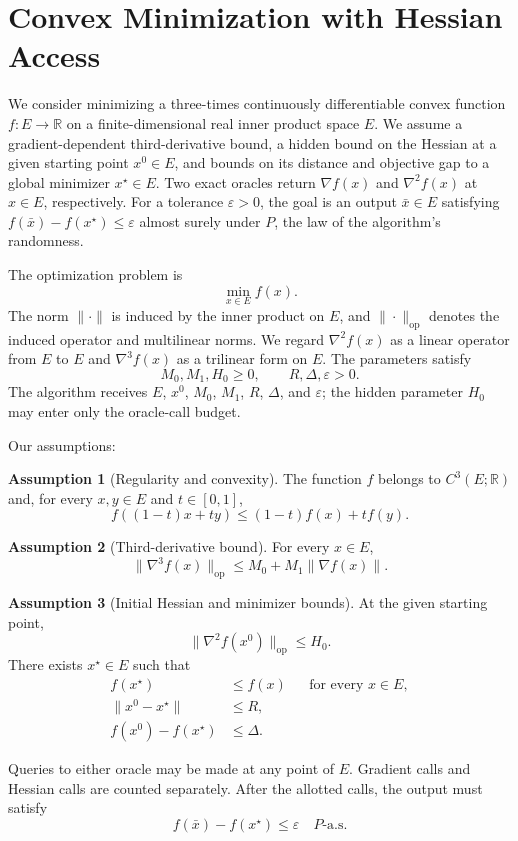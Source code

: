 \documentclass[10pt]{article}
\theoremstyle{definition}
\newtheorem{assumption}{Assumption}
\begin{document}
\section*{Convex Minimization with Hessian Access}
We consider minimizing a three-times continuously differentiable convex function $f:E\to\mathbb{R}$ on a finite-dimensional real inner product space $E$. We assume a gradient-dependent third-derivative bound, a hidden bound on the Hessian at a given starting point $x^0\in E$, and bounds on its distance and objective gap to a global minimizer $x^\star\in E$. Two exact oracles return $\nabla f(x)$ and $\nabla^2 f(x)$ at $x\in E$, respectively. For a tolerance $\varepsilon>0$, the goal is an output $\bar{x}\in E$ satisfying $f(\bar{x})-f(x^\star)\leq\varepsilon$ almost surely under $P$, the law of the algorithm's randomness.

The optimization problem is
\[
\min_{x\in E} f(x).
\]
The norm $\|\cdot\|$ is induced by the inner product on $E$, and $\|\cdot\|_{\mathrm{op}}$ denotes the induced operator and multilinear norms. We regard $\nabla^2 f(x)$ as a linear operator from $E$ to $E$ and $\nabla^3 f(x)$ as a trilinear form on $E$. The parameters satisfy
\[
M_0,M_1,H_0\geq 0,
\qquad R,\Delta,\varepsilon>0.
\]
The algorithm receives $E$, $x^0$, $M_0$, $M_1$, $R$, $\Delta$, and $\varepsilon$; the hidden parameter $H_0$ may enter only the oracle-call budget.

Our assumptions:
\begin{assumption}[Regularity and convexity]
The function $f$ belongs to $C^3(E;\mathbb{R})$ and, for every $x,y\in E$ and $t\in[0,1]$,
\[
f((1-t)x+ty)\leq (1-t)f(x)+t f(y).
\]
\end{assumption}

\begin{assumption}[Third-derivative bound]
For every $x\in E$,
\[
\|\nabla^3 f(x)\|_{\mathrm{op}}
\leq M_0+M_1\|\nabla f(x)\|.
\]
\end{assumption}

\begin{assumption}[Initial Hessian and minimizer bounds]
At the given starting point,
\[
\|\nabla^2 f(x^0)\|_{\mathrm{op}}\leq H_0.
\]
There exists $x^\star\in E$ such that
\[
\begin{aligned}
f(x^\star)&\leq f(x) &&\text{for every }x\in E,\\
\|x^0-x^\star\|&\leq R,\\
f(x^0)-f(x^\star)&\leq\Delta.
\end{aligned}
\]
\end{assumption}

Queries to either oracle may be made at any point of $E$. Gradient calls and Hessian calls are counted separately. After the allotted calls, the output must satisfy
\[
f(\bar{x})-f(x^\star)\leq\varepsilon
\quad P\text{-a.s.}
\]
\end{document}
